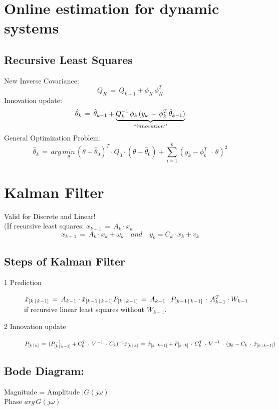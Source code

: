 \section*{Online estimation for dynamic systems}
\subsection*{Recursive Least Squares}
New Inverse Covariance:
\begin{equation*}
Q_K \, = \, Q_{k-1} + \phi_K\,\phi_K^T
\end{equation*}
Innovation update:
\begin{equation*}
\hat { \theta  } _{ k }\, =\, \hat { \theta  } _{ k-1 }+\underset { ``innovation'' }{ \underbrace { Q_{ k }^{ -1 }\, \phi _{ k }\, (y_{ k }\, -\, \phi _{ k }^{ T }\, \hat { \theta  } _{ k-1 }) }  } 
\end{equation*}
General Optimization Problem:
\begin{equation*}
\hat { \theta  } _{ k }\, =\, arg\, \underset { \theta  }{ min } \, (\theta -\hat { \theta  } _{ 0 })^{ T }\cdot Q_{ 0 }\cdot (\theta -\hat { \theta  } _{ 0 })+\sum _{ i=1 }^{ k }{ (y_k-\phi_k^T\ \, \cdot \, \theta)^2 } 
\end{equation*}

\section*{Kalman Filter}
Valid for Discrete and Linear!\\
(If recursive least squares: \( x_{ k+1 }\, =\, A_{ k }\cdot x_{ k } \)
\begin{equation*}
x_{ k+1 }\, =\, A_{ k }\cdot x_{ k }+\omega _{ k }\quad and\quad y_{ k }=C_{ k }\cdot x_{ k }+v_{ k }
\end{equation*}
\subsection*{Steps of Kalman Filter}
\begin{description}
\item[1 Prediction] $\hat { x } _{ [k\, |\, k-1] }\, =\, A_{ k-1 }\cdot \hat { x } _{ [k-1\, |\, k-1] }\\ P_{ [k\, |\, k-1] }\, =\, A_{ k-1 }\cdot { P }_{ [k-1\, |\, k-1] }\, \cdot \, A_{ k-1 }^{ T }\cdot { W }_{ k-1 }$ \\
if recursive linear least squares without \( { W }_{ k-1 } \).
\item[2 Innovation update] $P_{ [k\, |\, k] }\, =\, (P_{ [k\, |\, k-1] }^{ -1 }+C_{ k }^{ T }\, \cdot \, { V\,  }^{ -1 }\, \cdot \, C_{ k })^{ -1 }\\ \hat { x } _{ [k\, |\, k] }\, =\, \hat { x } _{ [k\, |\, k-1] }+P_{ [k\, |\, k] }\, \cdot \, C_{ k }^{ T }\, \cdot \, { V\,  }^{ -1 }\, \cdot \, (y_{ k }-C_{ k }\, \cdot \, \hat { x } _{ [k\, |\, k-1] })$
\end{description}

\subsection*{Bode Diagram:}
Magnitude = Amplitude $|G(j\omega)|$\\
Phase $arg \, G(j\omega)$






